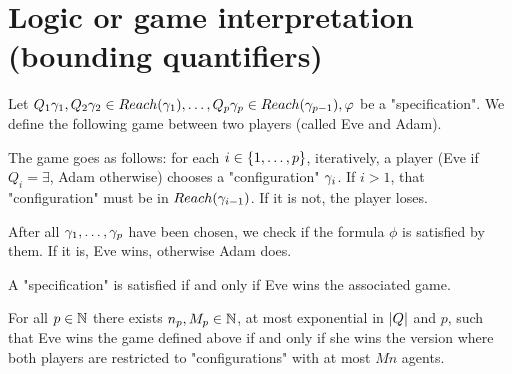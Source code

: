 \section{Logic or game interpretation (bounding quantifiers)}
\label{sec:quantifier-bounds}


\begin{definition}
	Let $Q_1 \gamma_1, Q_2 \gamma_2  \in Reach(\gamma_1), \ldots, Q_p \gamma_p \in Reach(\gamma_{p-1}), \varphi$ be a "specification". We define the following game between two players (called Eve and Adam).
	
	The game goes as follows: for each $i \in \{1,\dots,p\}$, iteratively, a player (Eve if $Q_i = \exists$, Adam otherwise) chooses a "configuration" $\gamma_i$. 
	If $i>1$, that "configuration" must be in $Reach(\gamma_{i-1})$. If it is not, the player loses.
	
	After all $\gamma_1, \ldots, \gamma_p$ have been chosen, we check if the formula $\phi$ is satisfied by them. If it is, Eve wins, otherwise Adam does.
\end{definition}

\begin{lemma}
	A "specification" is satisfied if and only if Eve wins the associated game.
\end{lemma}

\begin{lemma}
	For all $p \in \mathbb{N}$ there exists $n_p, M_p \in \mathbb{N}$, at most exponential in $|Q|$ and $p$,  such that Eve wins the game defined above if and only if she wins the version where both players are restricted to "configurations" with at most $Mn$ agents.
\end{lemma}

